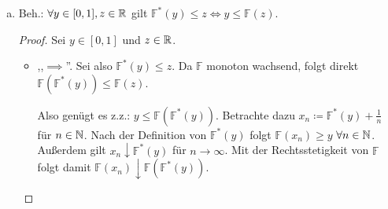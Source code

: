 \documentclass[uebung]{lecture}
\begin{document}
\begin{aufgabe}
    \begin{enumerate}[(a)]
        \item Beh.: $\forall y \in [0,1], z \in \mathbb{R}$ gilt $\mathbb{F}^{*}(y) \le z \iff y \le \mathbb{F}(z)$.
            \begin{proof}
                Sei $y \in [0,1]$ und $z \in \mathbb{R}$.
                \begin{itemize}
                    \item ,,$\implies$''. Sei also $\mathbb{F}^{*}(y) \le z$.
                Da $\mathbb{F}$ monoton wachsend, folgt direkt
                $\mathbb{F}(\mathbb{F}^{*}(y)) \le \mathbb{F}(z)$.

                Also genügt es z.z.: $y \le \mathbb{F}(\mathbb{F}^{*}(y))$.
                Betrachte dazu $x_n \coloneqq \mathbb{F}^{*}(y) + \frac{1}{n}$ für $n \in \mathbb{N}$. Nach
                der Definition von $\mathbb{F}^{*}(y)$ folgt $\mathbb{F}(x_n) \ge y$ $\forall n \in \mathbb{N}$.
                Außerdem gilt $x_n \downarrow \mathbb{F}^{*}(y)$ für $n \to \infty$. Mit
                der Rechtsstetigkeit von $\mathbb{F}$ folgt damit
                $\mathbb{F}(x_n) \downarrow \mathbb{F}(\mathbb{F}^{*}(y))$.


\end{itemize}
\end{proof}
\end{enumerate}
\end{aufgabe}
\end{document}
